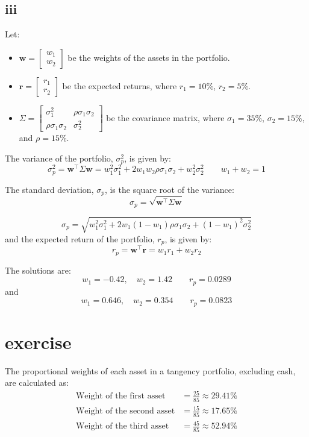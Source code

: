 \documentclass{article}
\begin{document}
\subsection*{iii}

Let:
\begin{itemize}
    \item \(\mathbf{w} = \begin{bmatrix} w_1 \\ w_2 \end{bmatrix}\) be the weights of the assets in the portfolio.
    \item \(\mathbf{r} = \begin{bmatrix} r_1 \\ r_2 \end{bmatrix}\) be the expected returns, where \(r_1 = 10\%\), \(r_2 = 5\%\).
    \item \(\Sigma = \begin{bmatrix} \sigma_1^2 & \rho \sigma_1 \sigma_2 \\ \rho \sigma_1 \sigma_2 & \sigma_2^2 \end{bmatrix}\) be the covariance matrix, where \(\sigma_1 = 35\%\), \(\sigma_2 = 15\%\), and \(\rho = 15\%\).
\end{itemize}

The variance of the portfolio, \(\sigma_p^2\), is given by:
\[
    \sigma_p^2 = \mathbf{w}^\top \Sigma \mathbf{w} = w_1^2 \sigma_1^2 + 2 w_1 w_2 \rho \sigma_1 \sigma_2 + w_2^2 \sigma_2^2\qquad w_1 + w_2 = 1
\]

The standard deviation, \(\sigma_p\), is the square root of the variance:
\[
    \sigma_p = \sqrt{\mathbf{w}^\top \Sigma \mathbf{w}}
\]

\[
    \sigma_p = \sqrt{w_1^2 \sigma_1^2 + 2 w_1 (1 - w_1) \rho \sigma_1 \sigma_2 + (1 - w_1)^2 \sigma_2^2}
\]
and the expected return of the portfolio, \(r_p\), is given by:
\[
    r_p = \mathbf{w}^\top \mathbf{r} = w_1 r_1 + w_2 r_2
\]

The solutions are:
\[
    w_1 = -0.42, \quad w_2 = 1.42\qquad r_p = 0.0289
\]
and
\[
    w_1 = 0.646, \quad w_2 = 0.354\qquad r_p = 0.0823
\]
\section{exercise}
The proportional weights of each asset in a tangency portfolio, excluding cash, are calculated as:
\begin{align*}
    \text{Weight of the first asset}  & = \frac{25}{85} \approx 29.41\% \\
    \text{Weight of the second asset} & = \frac{15}{85} \approx 17.65\% \\
    \text{Weight of the third asset}  & = \frac{45}{85} \approx 52.94\%
\end{align*}
\end{document}
